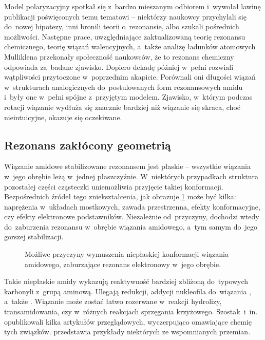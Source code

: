 Model polaryzacyjny spotkał się z~bardzo mieszanym odbiorem i~wywołał lawinę publikacji
  poświęconych temu tematowi \--- niektórzy naukowcy przychylali się do~nowej hipotezy,
  inni bronili teorii o~rezonansie, albo szukali pośrednich możliwości.
Następne prace, uwzględniające zaktualizowaną teorię rezonansu chemicznego,
  teorię wiązań walencyjnych, a~także analizę ładunków atomowych
  Mulliklena przekonały społeczność naukowców, że to rezonans chemiczny
  odpowiada za~badane zjawisko.
Dopiero dekadę później \citeauthor{kemnitz07} w~pełni rozwiali wątpliwości przytoczone
  w~poprzednim akapicie.
Porównali oni długości wiązań w~strukturach analogicznych do~postulowanych form rezonansowych
  amidu i~były one w~pełni spójne z~przyjętym modelem.
Zjawisko, w~którym podczas rotacji wiązanie  wydłuża się znacznie bardziej niż
  wiązanie  się skraca, choć nieintuicyjne, okazuje się oczekiwane. 

\subsection{Rezonans zakłócony geometrią}\label{literature:structure:geometry}
Wiązanie amidowe stabilizowane rezonansem jest płaskie \--- wszystkie wiązania w~jego obrębie
  leżą w~jednej płaszczyźnie.
W~niektórych przypadkach struktura pozostałej części cząsteczki uniemożliwia przyjęcie takiej
  konformacji.
Bezpośrednich źródeł tego zniekształcenia, jak obrazuje \cref{fig:non-planar} może być kilka:
  naprężenia w~układach mostkowych, zawada przestrzenna, efekty konformacyjne,
  czy efekty elektronowe podstawników.
Niezależnie od~przyczyny, dochodzi wtedy do~zaburzenia rezonansu w~obrębie wiązania amidowego,
  a~tym samym do~jego gorszej stabilizacji.
\begin{figure}
  
  \caption{
    Możliwe przyczyny wymuszenia niepłaskiej konformacji wiązania amidowego,
      zaburzające rezonans elektronowy w~jego obrębie.
  }
  \label{fig:non-planar}
\end{figure}

Takie niepłaskie amidy wykazują reaktywność bardziej zbliżoną do~typowych karbonyli z~grupą aminową.
Ulegają redukcji, addycji nukleofila do~wiązania , a~także .
Wiązanie  może zostać łatwo rozerwane w~reakcji hydrolizy, transamidowania,
  czy w~różnych reakcjach sprzęgania krzyżowego.
Szostak~i~in. opublikowali kilka artykułów przeglądowych,
  wyczerpująco omawiające chemię tych związków.
 przedstawia przykłady niektórych ze wspomnianych przemian.

